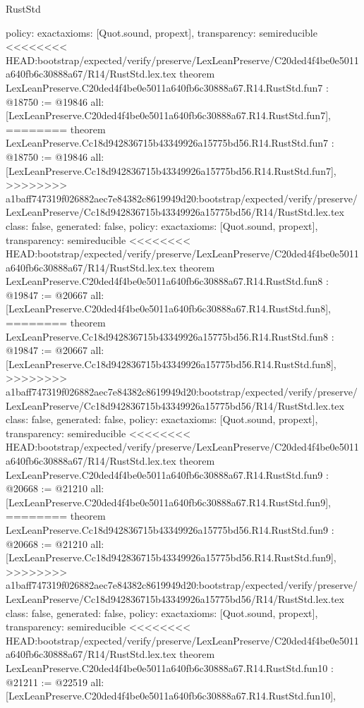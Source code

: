 \begin{lexlean}{RustStd}
\begin{coremodule}
{\begin{coremodule}
{{{{{{{{{{  policy: exact{axioms: [Quot.sound, propext]},
  transparency: semireducible
}
<<<<<<<< HEAD:bootstrap/expected/verify/preserve/LexLeanPreserve/C20ded4f4be0e5011a640fb6c30888a67/R14/RustStd.lex.tex
theorem LexLeanPreserve.C20ded4f4be0e5011a640fb6c30888a67.R14.RustStd.fun7 : @18750 := @19846 {
  all: [LexLeanPreserve.C20ded4f4be0e5011a640fb6c30888a67.R14.RustStd.fun7],
========
theorem LexLeanPreserve.Cc18d942836715b43349926a15775bd56.R14.RustStd.fun7 : @18750 := @19846 {
  all: [LexLeanPreserve.Cc18d942836715b43349926a15775bd56.R14.RustStd.fun7],
>>>>>>>> a1baff747319f026882aec7e84382c8619949d20:bootstrap/expected/verify/preserve/LexLeanPreserve/Cc18d942836715b43349926a15775bd56/R14/RustStd.lex.tex
  class: false,
  generated: false,
  policy: exact{axioms: [Quot.sound, propext]},
  transparency: semireducible
}
<<<<<<<< HEAD:bootstrap/expected/verify/preserve/LexLeanPreserve/C20ded4f4be0e5011a640fb6c30888a67/R14/RustStd.lex.tex
theorem LexLeanPreserve.C20ded4f4be0e5011a640fb6c30888a67.R14.RustStd.fun8 : @19847 := @20667 {
  all: [LexLeanPreserve.C20ded4f4be0e5011a640fb6c30888a67.R14.RustStd.fun8],
========
theorem LexLeanPreserve.Cc18d942836715b43349926a15775bd56.R14.RustStd.fun8 : @19847 := @20667 {
  all: [LexLeanPreserve.Cc18d942836715b43349926a15775bd56.R14.RustStd.fun8],
>>>>>>>> a1baff747319f026882aec7e84382c8619949d20:bootstrap/expected/verify/preserve/LexLeanPreserve/Cc18d942836715b43349926a15775bd56/R14/RustStd.lex.tex
  class: false,
  generated: false,
  policy: exact{axioms: [Quot.sound, propext]},
  transparency: semireducible
}
<<<<<<<< HEAD:bootstrap/expected/verify/preserve/LexLeanPreserve/C20ded4f4be0e5011a640fb6c30888a67/R14/RustStd.lex.tex
theorem LexLeanPreserve.C20ded4f4be0e5011a640fb6c30888a67.R14.RustStd.fun9 : @20668 := @21210 {
  all: [LexLeanPreserve.C20ded4f4be0e5011a640fb6c30888a67.R14.RustStd.fun9],
========
theorem LexLeanPreserve.Cc18d942836715b43349926a15775bd56.R14.RustStd.fun9 : @20668 := @21210 {
  all: [LexLeanPreserve.Cc18d942836715b43349926a15775bd56.R14.RustStd.fun9],
>>>>>>>> a1baff747319f026882aec7e84382c8619949d20:bootstrap/expected/verify/preserve/LexLeanPreserve/Cc18d942836715b43349926a15775bd56/R14/RustStd.lex.tex
  class: false,
  generated: false,
  policy: exact{axioms: [Quot.sound, propext]},
  transparency: semireducible
}
<<<<<<<< HEAD:bootstrap/expected/verify/preserve/LexLeanPreserve/C20ded4f4be0e5011a640fb6c30888a67/R14/RustStd.lex.tex
theorem LexLeanPreserve.C20ded4f4be0e5011a640fb6c30888a67.R14.RustStd.fun10 : @21211 := @22519 {
  all: [LexLeanPreserve.C20ded4f4be0e5011a640fb6c30888a67.R14.RustStd.fun10],
}}}}}}}}}}}}}
\end{coremodule}}
\end{coremodule}
\end{lexlean}
